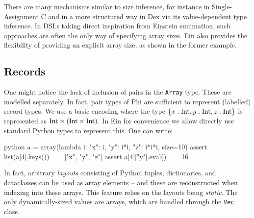 There are many mechanisms similar to size inference, for instance in Single-Assignment C and in a more structured way in Dex via its value-dependent type inference. In DSLs taking direct inspiration from Einstein summation, such approaches are often the only way of specifying array sizes. Ein also provides the flexibility of providing an explicit array size, as shown in the former example.

\subsection{Records}

One might notice the lack of inclusion of pairs in the \texttt{Array} type. These are modelled separately. In fact, pair types of Phi are sufficient to represent (labelled) record types. We use a basic encoding where the type $\{ x: \mathrm{Int}, y: \mathrm{Int}, z: \mathrm{Int} \}$ is represented as $\phipairtype{\phiinttype}{\left( \phiinttype \times \phiinttype \right)}$. In Ein for convenience we allow directly use standard Python types to represent this. One can write:
\begin{center} 
\begin{cminted}{python}
a = array(lambda i: {"x": i, "y": i*i, "z": i*i*i}, size=10)
assert list(a[4].keys()) == ["x", "y", "z"]
assert a[4]["y"].eval() == 16
\end{cminted}
\end{center}
In fact, arbitrary \textit{layouts} consisting of Python tuples, dictionaries, and dataclasses can be used as array elements -- and these are reconstructed when indexing into these arrays. This feature relies on the layouts being \textit{static}. The only dynamically-sized values are arrays, which are handled through the \texttt{Vec} class. 

